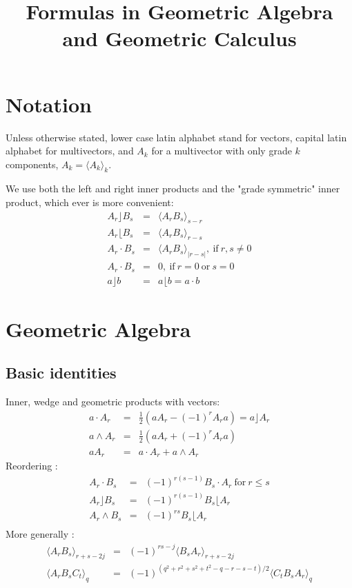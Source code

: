 \documentclass[a4paper,12pt]{article}
\title{Formulas in Geometric Algebra and Geometric Calculus}
\author{}
\newcommand{\grade}[2]{\ensuremath{\langle#2\rangle_{#1}}}
\newcommand{\linner}{\ensuremath{\rfloor}}
\newcommand{\rinner}{\ensuremath{\lfloor}}
\providecommand{\abs}[1]{\lvert#1\rvert}
\begin{document}
\maketitle

\section{Notation}

Unless otherwise stated, lower case latin alphabet stand for vectors, capital latin alphabet for multivectors, and $A_k$ for a multivector with only grade $k$ components, $A_k = \grade{k}{A_k}$.

We use both the left and right inner products and the "grade symmetric" inner product, which ever is more convenient:
\begin{eqnarray}
A_r \linner B_s &=& \grade{s-r}{A_r B_s}\\
A_r \rinner B_s &=& \grade{r-s}{A_r B_s}\\
A_r \cdot B_s &=& \grade{\abs{r-s}}{A_r B_s},\ \textrm{if}\ r, s \neq 0\\
A_r \cdot B_s &=& 0,\ \textrm{if}\ r = 0\ \textrm{or}\ s = 0\\
a \linner b &=& a \rinner b = a \cdot b
\end{eqnarray}

\section{Geometric Algebra}

\subsection{Basic identities}

Inner, wedge and geometric products with vectors\cite{CA2GC}:
\begin{eqnarray}
a\cdot A_r &=& \frac{1}{2}(a A_r - (-1)^r A_r a) = a\linner A_r\\
a\wedge A_r &=& \frac{1}{2}(a A_r + (-1)^r A_r a)\\
a A_r &=& a \cdot A_r + a \wedge A_r
\end{eqnarray}
Reordering \cite{CA2GC, Chisolm:2012aa}:
\begin{eqnarray}
 A_r\cdot B_s &=& (-1)^{r(s-1)} B_s \cdot A_r\ \textrm{for}\ r \leq s\\
 A_r\linner B_s &=& (-1)^{r(s-1)} B_s \rinner A_r\\
 A_r\wedge B_s &=& (-1)^{rs} B_s \rinner A_r\\
\end{eqnarray}
More generally \cite{CA2GC, Chisolm:2012aa}:
\begin{eqnarray}
 \grade{r+s-2j}{A_r B_s} &=& (-1)^{rs - j} \grade{r + s - 2j}{B_s A_r}\\
 \grade{q}{A_r B_s C_t} &=& (-1)^{(q^2 + r^2 + s^2 + t^2 - q - r - s - t)/2} \grade{q}{C_t B_s A_r}
\end{eqnarray}
\end{document}

